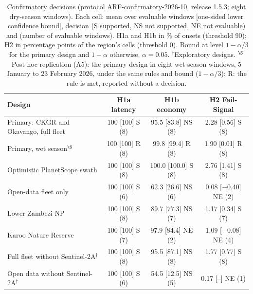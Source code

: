 \begin{table}[H]
\centering
\footnotesize
\renewcommand{\arraystretch}{1.25}
\setlength{\tabcolsep}{3pt}
\caption{Confirmatory decisions (protocol ARF-confirmatory-2026-10, release 1.5.3; eight dry-season windows). Each cell: mean over evaluable windows [one-sided lower confidence bound], decision (S supported, NS not supported, NE not evaluable) and (number of evaluable windows). H1a and H1b in \% of onsets (threshold 90); H2 in percentage points of the region's cells (threshold 0). Bound at level $1-\alpha/3$ for the primary design and $1-\alpha$ otherwise, $\alpha = 0.05$. $^{\dagger}$Exploratory designs. $^{\S}$Post hoc replication (A5): the primary design in eight wet-season windows, 5 January to 23 February 2026, under the same rules and bound ($1-\alpha/3$); R: the rule is met, reported without a decision.}
\label{tab:confirm}
\begin{tabular}{|>{\raggedright\arraybackslash}p{3.6cm}|c|c|c|}
\hline
Design & H1a latency & H1b economy & H2 Fail-Signal \\
\hline
Primary: CKGR and Okavango, full fleet & 100 [100] S (8) & 95.5 [83.8] NS (8) & 2.28 [0.56] S (8) \\
\hline
Primary, wet season$^{\S}$ & 100 [100] R (8) & 99.8 [99.4] R (8) & 1.90 [0.01] R (8) \\
\hline
Optimistic PlanetScope swath & 100 [100] S (8) & 100.0 [100.0] S (8) & 2.76 [1.41] S (8) \\
\hline
Open-data fleet only & 100 [100] S (6) & 62.3 [26.6] NS (6) & 0.08 [$-$0.40] NE (2) \\
\hline
Lower Zambezi NP & 100 [100] S (8) & 89.7 [77.3] NS (7) & 1.17 [0.34] S (7) \\
\hline
Karoo Nature Reserve & 100 [100] S (7) & 97.9 [84.4] NE (2) & 1.09 [$-$0.08] NE (4) \\
\hline
Full fleet without Sentinel-2A$^{\dagger}$ & 100 [100] S (8) & 95.5 [87.1] NS (8) & 1.77 [0.77] S (8) \\
\hline
Open data without Sentinel-2A$^{\dagger}$ & 100 [100] S (6) & 54.5 [12.5] NS (5) & 0.17 [--] NE (1) \\
\hline
\end{tabular}
\end{table}
